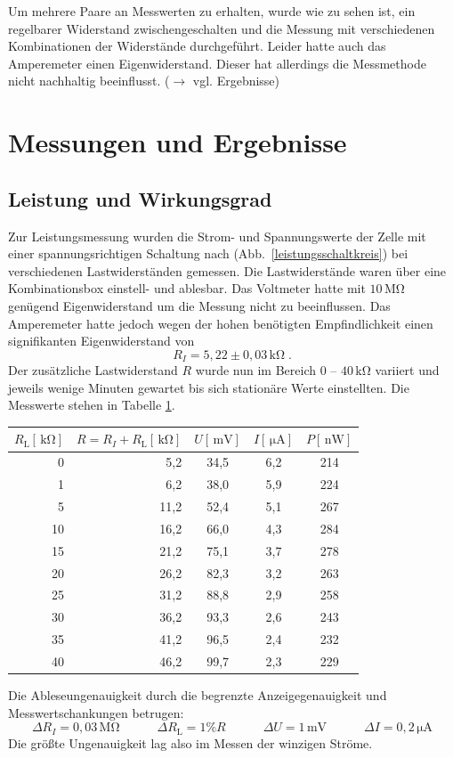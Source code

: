 \documentclass[11pt]{scrartcl}
\newcommand{\unit}[1]{\ensuremath{\,\mathrm{#1}}} %
\begin{document}
Um mehrere Paare an Messwerten zu erhalten, wurde wie zu sehen ist, ein regelbarer Widerstand zwischengeschalten und die Messung mit verschiedenen Kombinationen der Widerst\"ande durchgef\"uhrt. Leider hatte auch das Amperemeter einen Eigenwiderstand. Dieser hat allerdings die Messmethode nicht nachhaltig beeinflusst. ($\rightarrow$ vgl. Ergebnisse) %





\section{Messungen und Ergebnisse}
\subsection{Leistung und Wirkungsgrad}
Zur Leistungsmessung wurden die Strom- und Spannungswerte der Zelle mit einer spannungsrichtigen Schaltung nach (Abb.~\ref{leistungsschaltkreis}) bei verschiedenen Lastwiderständen gemessen. Die Lastwiderstände waren über eine Kombinationsbox einstell- und ablesbar. Das Voltmeter hatte mit $10\unit{M\Omega}$ genügend Eigenwiderstand um die Messung nicht zu beeinflussen. Das Amperemeter hatte jedoch wegen der hohen benötigten Empfindlichkeit einen signifikanten Eigenwiderstand von
\[
R_I = 5,22\pm 0,03 \unit{k\Omega}\;.
\]
Der zusätzliche Lastwiderstand $R$ wurde nun im Bereich 0 -- $40\unit{k\Omega}$ variiert und jeweils wenige Minuten gewartet bis sich stationäre Werte einstellten. Die Messwerte stehen in Tabelle \ref{leistungsmesstabelle}.
\begin{table}[ht]
\begin{center}
\begin{tabular}{rr|ccc}
$R_{\text{L}}[\unit{k\Omega}]$ &
$R = R_I+R_{\text{L}} [\unit{k\Omega}]$ &
$U [\unit{mV}]$ &
$I [\unit{\mu A}]$ &
$P [\unit{nW}]$ \\
\hline
0	& 5,2	& 34,5	& 6,2	& 214 \\
1	& 6,2	& 38,0	& 5,9	& 224 \\
5	& 11,2	& 52,4	& 5,1	& 267 \\
10	& 16,2	& 66,0	& 4,3	& 284 \\
15	& 21,2	& 75,1	& 3,7	& 278 \\
20	& 26,2	& 82,3	& 3,2	& 263 \\
25	& 31,2	& 88,8	& 2,9	& 258 \\
30	& 36,2	& 93,3	& 2,6	& 243 \\
35	& 41,2	& 96,5	& 2,4	& 232 \\
40	& 46,2	& 99,7	& 2,3	& 229
\end{tabular}
\end{center}
\label{leistungsmesstabelle}
\end{table}
Die Ableseungenauigkeit durch die begrenzte Anzeigegenauigkeit und Messwertschankungen betrugen:
\[
\Delta R_I = 0,03\unit{M\Omega}
\qquad\quad
\Delta R_{\text{L}} = 1\% R
\qquad\quad
\Delta U = 1\unit{mV}
\qquad\quad
\Delta I = 0,2\unit{\mu A}
\]
Die größte Ungenauigkeit lag also im Messen der winzigen Ströme.
\end{document}
